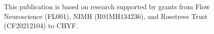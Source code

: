 This publication is based on research supported by grants from Flow Neuroscience (FL001), NIMH (R01MH134236), and Rosetrees Trust (CF20212104) to CHYF.
